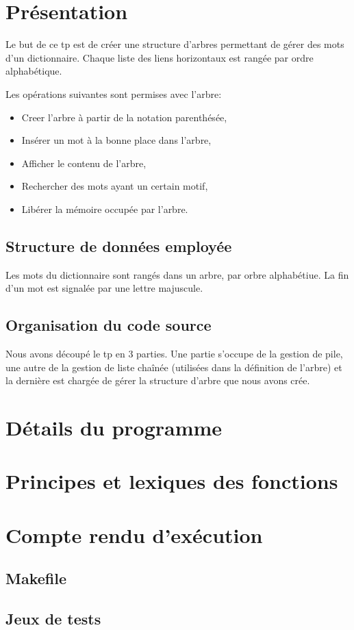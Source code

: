\documentclass{report}
\begin{document}
  
  \tableofcontents
  \setlength{\parskip}{10pt}
  \setlength{\parindent}{0pt}
  \chapter{Présentation}
    Le but de ce tp est de créer une structure d'arbres permettant de gérer des mots d'un dictionnaire. Chaque liste des liens horizontaux est rangée par ordre alphabétique.

    Les opérations suivantes sont permises avec l'arbre:
    \begin{itemize}
      \item Creer l'arbre à partir de la notation parenthésée,
      \item Insérer un mot à la bonne place dans l'arbre,
      \item Afficher le contenu de l'arbre,
      \item Rechercher des mots ayant un certain motif,
      \item Libérer la mémoire occupée par l'arbre.
    \end{itemize}

    \section{Structure de données employée}
      Les mots du dictionnaire sont rangés dans un arbre, par orbre alphabétiue. La fin d'un mot est signalée par une lettre majuscule.
    \section{Organisation du code source}
      Nous avons découpé le tp en 3 parties. Une partie s'occupe de la gestion de pile, une autre de la gestion de liste chaînée (utilisées dans la définition de l'arbre) et la dernière est chargée de gérer la structure d'arbre que nous avons crée.

    
  \chapter{Détails du programme}
    

  \chapter{Principes et lexiques des fonctions}
    

  \chapter{Compte rendu d'exécution}
    \section{Makefile}

    \section{Jeux de tests}
%      
\end{document}
